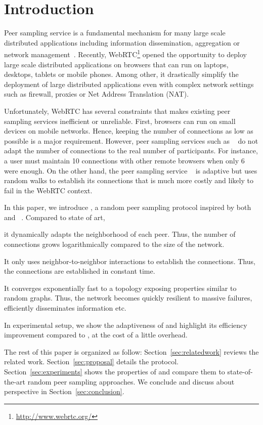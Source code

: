 
\section{Introduction}

Peer sampling service is a fundamental mechanism for many large scale
distributed applications including information dissemination, aggregation
 or network management~\cite{jelasity2007gossip}. Recently,
WebRTC\footnote{\url{http://www.webrtc.org/}} opened the opportunity to deploy large scale distributed
applications on browsers that can run on laptops, desktops, tablets or mobile
phones. Among other, it drastically simplify the deployment of large
distributed applications even with complex network settings such as firewall,
proxies or Net Address Translation (NAT).

Unfortunately, WebRTC has several constraints that makes existing peer
sampling services inefficient or unreliable. First, browsers can run
on small devices on mobile networks. Hence, keeping the number of
connections as low as possible is a major requirement. However, peer
sampling services such as \CYCLON{}~\cite{ voulgaris2005cyclon} do not
adapt the number of connections to the real number of
participants. For instance, a user must maintain 10 connections with
other remote browsers when only 6 were enough. On the other hand, the
peer sampling service \SCAMP{}~\cite{ganesh2003peer} is adaptive but
uses random walks to establish its connections that is much more
costly and likely to fail in the WebRTC context.

In this paper, we introduce \SPRAY{}, a random peer sampling protocol
inspired by both \SCAMP{}~\cite{ganesh2003peer} and
\CYCLON{}~\cite{voulgaris2005cyclon}. Compared to state of art,
\begin{inparaenum}[(i)]
\item it dynamically adapts the neighborhood of each peer. Thus, the number of
  connections grows logarithmically compared to the size of the network.
\item It only uses neighbor-to-neighbor interactions to establish the
  connections. Thus, the connections are established in constant time.
\item It converges exponentially fast to a topology exposing properties similar
  to random graphs. Thus, the network becomes quickly resilient to massive
  failures, efficiently disseminates information etc.
\item In experimental setup, we show the adaptiveness of \SPRAY{} and
  highlight its efficiency improvement compared to \CYCLON{}, at the cost of a
  little overhead.
\end{inparaenum}

The rest of this paper is organized as follow: Section~\ref{sec:relatedwork}
reviews the related work. Section~\ref{sec:proposal} details the \SPRAY{}
protocol.  Section~\ref{sec:experiments} shows the properties of \SPRAY{}
and compare them to state-of-the-art random peer sampling approaches. We
conclude and discuss about perspective in Section~\ref{sec:conclusion}.

